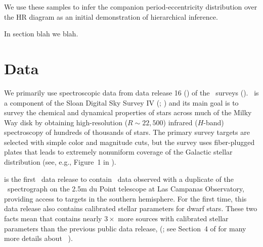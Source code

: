 \documentclass[modern]{aastex63}
\begin{document}
We use these samples to infer the companion period-eccentricity distribution
over the HR diagram as an initial demonstration of hierarchical inference.

In section blah we blah.

\section{Data} \label{sec:data}

We primarily use spectroscopic data from data release 16 () of the
\apogee\ surveys (\citealt{Majewski:2017, DR16}).
\apogee\ is a component of the Sloan Digital Sky Survey IV (\sdssiv;
\citealt{Gunn:2006, Blanton:2017}) and its main goal is to survey the chemical
and dynamical properties of stars across much of the Milky Way disk by obtaining
high-resolution ($R \sim 22,500$) infrared ($H$-band) spectroscopy of hundreds
of thousands of stars.
The primary survey targets are selected with simple color and magnitude cuts,
but the survey uses fiber-plugged plates that leads to extremely nonuniform
coverage of the Galactic stellar distribution (see, e.g., Figure~1 in
\citealt{DR16}).

 is the first \sdss\ data release to contain \apogee\ data observed with
a duplicate of the \apogee\ spectrograph on the 2.5m du Point telescope at Las
Campanas Observatory, providing access to targets in the southern hemisphere.
For the first time, this data release also contains calibrated stellar
parameters for dwarf stars.
These two facts mean that  contains nearly $3\times$ more sources with
calibrated stellar parameters than the previous public data release, 
(\citealt{Abolfathi:2017}; see Section~4 of \citealt{DR16} for many more details
about \apogee\ ).
\end{document}
